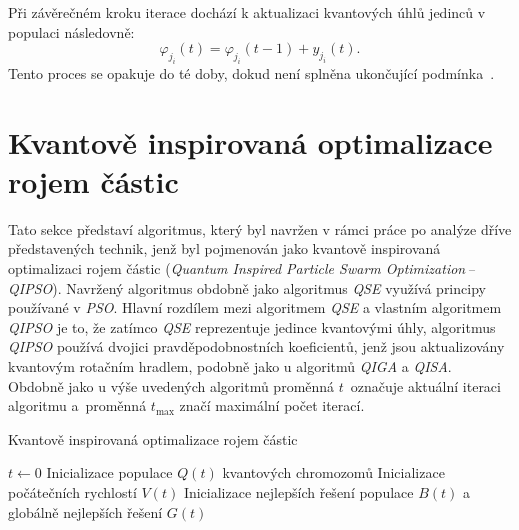 Při závěrečném kroku iterace dochází k aktualizaci kvantových úhlů jedinců v populaci následovně:
\begin{equation*}
    \varphi_{j_i}\left(t\right) = \varphi_{j_i}\left(t-1\right) + y_{j_i}\left(t\right).
\end{equation*}
Tento proces se opakuje do té doby, dokud není splněna ukončující podmínka~\cite{qse}.

\section{Kvantově inspirovaná optimalizace rojem částic}\label{sec:qipso}
Tato sekce představí algoritmus, který byl navržen v rámci práce po analýze dříve představených technik, jenž byl pojmenován jako kvantově inspirovaná optimalizaci rojem částic (\emph{Quantum Inspired Particle Swarm Optimization\,--\,QIPSO}).
Navržený algoritmus obdobně jako algoritmus \emph{QSE} využívá principy používané v \emph{PSO}. 
Hlavní rozdílem mezi algoritmem \emph{QSE} a vlastním algoritmem \emph{QIPSO} je to, že zatímco \emph{QSE} reprezentuje jedince kvantovými úhly, algoritmus \emph{QIPSO} používá dvojici pravděpodobnostních koeficientů, jenž jsou aktualizovány kvantovým rotačním hradlem, podobně jako u algoritmů \emph{QIGA} a \emph{QISA}. 
Obdobně jako u výše uvedených algoritmů proměnná $t$~označuje aktuální iteraci algoritmu a~proměnná $t_{\text{max}}$ značí maximální počet iterací. 

\begin{algorithm}[ht]
    \caption{Kvantově inspirovaná optimalizace rojem částic}
    \label{alg:qipso}
    $t \gets 0$\;
    Inicializace populace $Q\left(t\right)$ kvantových chromozomů\;
    Inicializace počátečních rychlostí $V\left(t\right)$\;
    Inicializace nejlepších řešení populace $B\left(t\right)$ a globálně nejlepších řešení $G\left(t\right)$\;
\end{algorithm}

